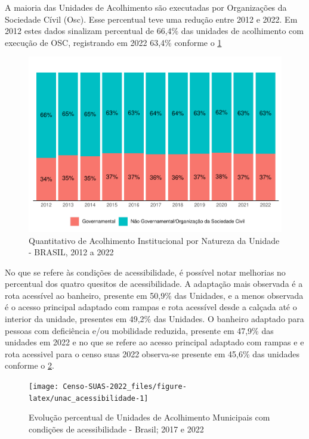 \documentclass[
  brazilian]{report}
\begin{document}
A maioria das Unidades de Acolhimento são executadas por Organizações da
Sociedade Cívil (Osc). Esse percentual teve uma redução entre 2012 e
2022. Em 2012 estes dados sinalizam percentual de 66,4\% das unidades de
acolhimento com execução de OSC, registrando em 2022 63,4\% conforme o
\cref{fig:acolh_nat}

\begin{figure}
\includegraphics{Censo-SUAS-2022_files/figure-latex/acolh_nat-1} \caption[Quantitativo de Acolhimento Institucional por Natureza da Unidade - BRASIL, 2012 a 2022]{Quantitativo de Acolhimento Institucional por Natureza da Unidade - BRASIL, 2012 a 2022}\label{fig:acolh_nat}
\end{figure}

No que se refere às condições de acessibilidade, é possível notar
melhorias no percentual dos quatro quesitos de acessibilidade. A
adaptação mais observada é a rota acessível ao banheiro, presente em
50,9\% das Unidades, e a menos observada é o acesso principal adaptado
com rampas e rota acessível desde a calçada até o interior da unidade,
presentes em 49,2\% das Unidades. O banheiro adaptado para pessoas com
deficiência e/ou mobilidade reduzida, presente em 47,9\% das unidades em
2022 e no que se refere ao acesso principal adaptado com rampas e e rota
acessivel para o censo suas 2022 observa-se presente em 45,6\% das
unidades conforme o \cref{fig:unac_acessibilidade}.

\begin{figure}
\texttt{[image: Censo-SUAS-2022\_files/figure-latex/unac\_acessibilidade-1]} \caption[Evolução percentual de Unidades de Acolhimento Municipais com condições de acessibilidade - Brasil]{Evolução percentual de Unidades de Acolhimento Municipais com condições de acessibilidade - Brasil; 2017 e 2022}\label{fig:unac_acessibilidade}
\end{figure}
\end{document}
